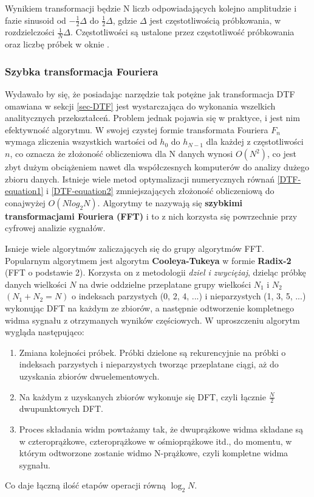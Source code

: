 \documentclass[12pt,a4paper,twoside]{mwart}
\begin{document}
Wynikiem transformacji będzie N liczb odpowiadających kolejno amplitudzie i fazie sinusoid od $- \frac{1}{2} \Delta $ do $\frac{1}{2} \Delta $, gdzie $\Delta$ jest częstotliwością próbkowania, w rozdzielczości $\frac{1}{N} \Delta$. Częstotliwości są ustalone przez częstotliwość próbkowania oraz liczbę próbek w oknie \cite[198 - 200, 204-206]{CyfrowePrzetwarzanieSygnalowOdTeoriiDoZastosowan}.

\subsubsection{Szybka transformacja Fouriera} \label{sec-FFT}
Wydawało by się, że posiadając narzędzie tak potężne jak transformacja DTF omawiana w sekcji \ref{sec-DTF} jest wystarczająca do wykonania wszelkich analitycznych przekształceń. Problem jednak pojawia się w praktyce, i jest nim efektywność algorytmu. W swojej czystej formie transformata Fouriera $F_n$ wymaga zliczenia wszystkich wartości od $h_0$ do $h_{N-1}$ dla każdej z częstotliwości $n$, co oznacza że złożoność obliczeniowa dla N danych wynosi $O(N^2)$, co jest zbyt dużym obciążeniem nawet dla współczesnych komputerów do analizy dużego zbioru danych. Istnieje wiele metod optymalizacji numerycznych równań \ref{DTF-equation1} i \ref{DTF-equation2} zmniejszających złożoność obliczeniową do conajwyżej $O(N log_2 N)$. Algorytmy te nazywają się \textbf{szybkimi transformacjami Fouriera (FFT)} i to z nich korzysta się powrzechnie przy cyfrowej analizie sygnałów.

Isnieje wiele algorytmów zaliczających się do grupy algorytmów FFT. Popularnym algorytmem jest algorytm \textbf{Cooleya-Tukeya} w formie \textbf{Radix-2} (FFT o podstawie 2). Korzysta on z metodologii \textit{dziel i zwyciężaj}, dzieląc próbkę danych wielkości $N$ na dwie oddzielne przeplatane grupy wielkości $N_1$ i $N_2$ $(N_1 + N_2 = N)$ o indeksach parzystych (0, 2, 4, ...) i nieparzystych (1, 3, 5, ...) wykonując DFT na każdym ze zbiorów, a następnie odtworzenie kompletnego widma sygnału z otrzymanych wyników częściowych. W uproszczeniu algorytm wygląda następująco:
\begin{enumerate}
  \item{Zmiana kolejności próbek. Próbki dzielone są rekurencyjnie na próbki o indeksach parzystych i nieparzystych tworząc przeplatane ciągi, aż do uzyskania zbiorów dwuelementowych.}
  \item{Na każdym z uzyskanych zbiorów wykonuje się DFT, czyli łącznie $\frac{N}{2}$ dwupunktowych DFT.}
  \item{Proces składania widm powtażamy tak, że dwuprążkowe widma składane są w czteroprążkowe, czteroprążkowe w ośmioprążkowe itd., do momentu, w którym odtworzone zostanie widmo N-prążkowe, czyli kompletne widma sygnału.}
\end{enumerate}
Co daje łączną ilość etapów operacji równą $\log_2 N$. \cite[241-252]{CyfrowePrzetwarzanieSygnalowOdTeoriiDoZastosowan}
\end{document}
